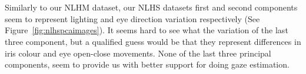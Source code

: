 \begin{minipage}{\linewidth}
{\begin{tabular}{ccccccc}
  \end{tabular}
  }
  \label{fig:nlhspcaimages}
  \end{minipage}\\\\

  Similarly to our NLHM dataset, our NLHS datasets first and second components seem to represent lighting and eye direction variation respectively (See Figure~\ref{fig:nlhspcaimages}).
  It seems hard to see what the variation of the last three component, but a qualified guess would be that they represent differences in iris colour and eye open-close movements. None of the last three principal components,
  seem to provide us with better support for doing gaze estimation.\\

